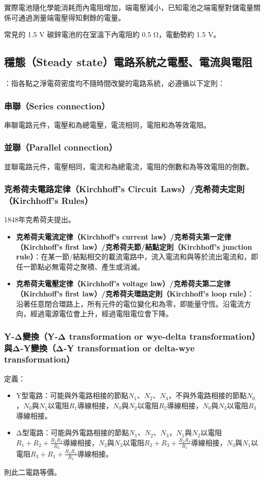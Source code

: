 \documentclass[a4paper,12pt]{report}
\begin{document}
\begin{itemize}
實際電池隨化學能消耗而內電阻增加，端電壓減小，已知電池之端電壓對儲電量關係可通過測量端電壓得知剩餘的電量。

常見的 1.5 V 碳鋅電池的在室溫下內電阻約 0.5 Ω，電動勢約 1.5 V。
\subsection{穩態（Steady state）電路系統之電壓、電流與電阻}
：指各點之淨電荷密度均不隨時間改變的電路系統，必遵循以下定則：
\subsubsection{串聯（Series connection）}
串聯電路元件，電壓和為總電壓，電流相同，電阻和為等效電阻。
\subsubsection{並聯（Parallel connection）}
並聯電路元件，電壓相同，電流和為總電流，電阻的倒數和為等效電阻的倒數。
\subsubsection{克希荷夫電路定律（Kirchhoff's Circuit Laws）/克希荷夫定則（Kirchhoff's Rules）}
1848年克希荷夫提出。
\begin{itemize}
\item \textbf{克希荷夫電流定律（Kirchhoff's current law）/克希荷夫第一定律（Kirchhoff's first law）/克希荷夫節/結點定則（Kirchhoff's junction rule）}：在某一節/結點相交的載流電路中，流入電流和與等於流出電流和，即任一節點必無電荷之聚積、產生或消滅。
\item \textbf{克希荷夫電壓定律（Kirchhoff's voltage law）/克希荷夫第二定律（Kirchhoff's first law）/克希荷夫環路定則（Kirchhoff's loop rule）}：沿著任意閉合環路上，所有元件的電位變化和為零，即能量守恆。沿電流方向，經過電源電位會上升，經過電阻電位會下降。
\end{itemize}
\subsubsection{Y-Δ變換（Y-Δ transformation or wye-delta transformation）與Δ-Y變換（Δ-Y transformation or delta-wye transformation）}
定義：
\begin{itemize}
\item Y型電路：可能與外電路相接的節點$N_1$、$N_2$、$N_3$，不與外電路相接的節點$N_0$，$N_0$與$N_1$以電阻$R_1$導線相接，$N_0$與$N_2$以電阻$R_2$導線相接，$N_0$與$N_3$以電阻$R_3$導線相接。
\item Δ型電路：可能與外電路相接的節點$N_1$、$N_2$、$N_3$，$N_1$與$N_2$以電阻$R_1+R_2+\frac{R_1R_2}{R_3}$導線相接，$N_2$與$N_3$以電阻$R_2+R_3+\frac{R_2R_3}{R_1}$導線相接，$N_3$與$N_1$以電阻$R_3+R_1+\frac{R_3R_1}{R_2}$導線相接。
\end{itemize}
則此二電路等價。

\end{itemize}
\end{document}
